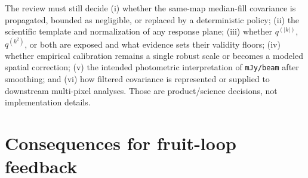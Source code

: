 \documentclass[11pt]{article}
\newcommand{\code}[1]{\nolinkurl{#1}}
\begin{document}
The review must still decide (i) whether the same-map median-fill covariance
is propagated, bounded as negligible, or replaced by a deterministic policy;
(ii) the scientific template and normalization of any response plane;
(iii) whether $q^{(|k|)}$, $q^{(k^2)}$, or both are exposed and what evidence
sets their validity floors; (iv) whether empirical calibration remains a
single robust scale or becomes a modeled spatial correction; (v) the intended
photometric interpretation of \code{mJy/beam} after smoothing; and (vi) how
filtered covariance is represented or supplied to downstream multi-pixel
analyses.  Those are product/science decisions, not implementation details.

\section{Consequences for fruit-loop feedback}
\label{sec:fruitloop}
\end{document}
